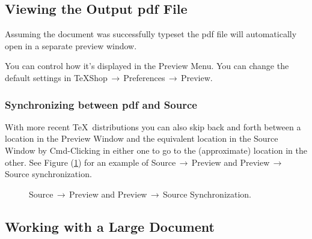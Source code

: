 \documentclass[letterpaper,11pt]{article}
\newcommand{\acr}[1]{\textsf{#1}}
\newcommand{\cmd}[1]{\textsf{#1}}
\newcommand{\mnu}[1]{\textsf{#1}}
\newcommand{\To}{\,\(\to\)\,}
\begin{document}
\subsection{Viewing the Output \acr{pdf} File}

Assuming the document was successfully typeset the \acr{pdf} file will automatically open in a separate preview window.

You can control how it's displayed in the \mnu{Preview} Menu. You can change the default settings in \mnu{TeXShop}\To\mnu{Preferences}\To\mnu{Preview}.

\subsubsection{Synchronizing between \acr{pdf} and Source}

With more recent \TeX\ distributions you can also skip back and forth between a location in the Preview Window and the equivalent location in the Source Window by \cmd{Cmd-Clicking} in either one to go to the (approximate) location in the other. See Figure (\ref{fig:SourcePreviewSync}) for an example of Source\To Preview and Preview\To Source synchronization.

\begin{figure}
\centering
{}\qquad{}
\caption{Source\protect\To Preview and Preview\protect\To Source Synchronization.}
\label{fig:SourcePreviewSync}
\end{figure}

\subsection{Working with a Large Document}
\end{document}
